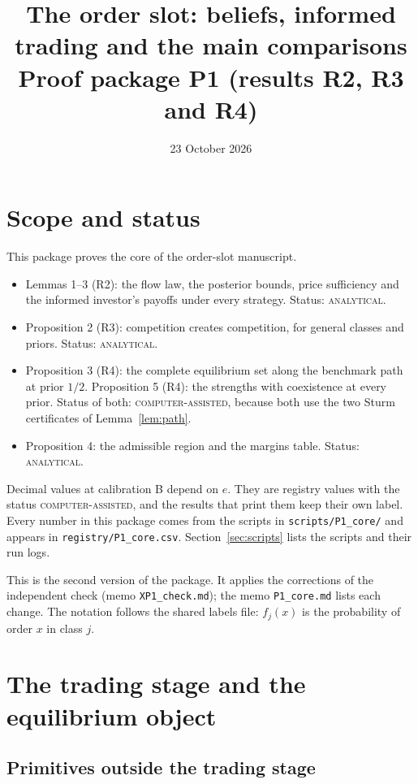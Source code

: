 \documentclass[11pt]{article}
\title{The order slot: beliefs, informed trading and the main comparisons\\[2pt]
\large Proof package P1 (results R2, R3 and R4)}
\author{}
\date{23 October 2026}
\theoremstyle{definition}
\newcommand{\lab}[1]{\textsc{#1}}
\begin{document}
\maketitle

\section*{Scope and status}

This package proves the core of the order-slot manuscript.
\begin{itemize}
\item Lemmas 1--3 (R2): the flow law, the posterior bounds, price sufficiency and the informed investor's
  payoffs under every strategy. Status: \lab{analytical}.
\item Proposition 2 (R3): competition creates competition, for general classes and priors.
  Status: \lab{analytical}.
\item Proposition 3 (R4): the complete equilibrium set along the benchmark path at prior $1/2$.
  Proposition 5 (R4): the strengths with coexistence at every prior. Status of both: \lab{computer-assisted},
  because both use the two Sturm certificates of Lemma~\ref{lem:path}.
\item Proposition 4: the admissible region and the margins table. Status: \lab{analytical}.
\end{itemize}
Decimal values at calibration B depend on $e$. They are registry values with the status
\lab{computer-assisted}, and the results that print them keep their own label.
Every number in this package comes from the scripts in \texttt{scripts/P1\_core/} and appears in
\texttt{registry/P1\_core.csv}. Section~\ref{sec:scripts} lists the scripts and their run logs.

This is the second version of the package. It applies the corrections of the independent check
(memo \texttt{XP1\_check.md}); the memo \texttt{P1\_core.md} lists each change. The notation follows the shared
labels file: $f_j(x)$ is the probability of order $x$ in class $j$.

\section{The trading stage and the equilibrium object}\label{sec:model}

\subsection{Primitives outside the trading stage}
\end{document}
